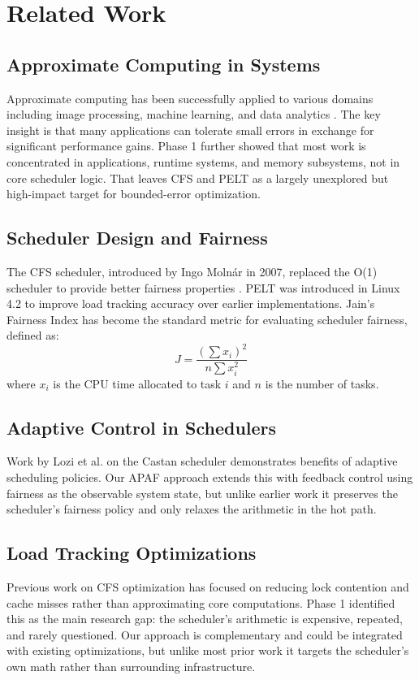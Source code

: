 \documentclass[conference]{IEEEtran}
\begin{document}
\section{Related Work}\label{sec:relwork}

\subsection{Approximate Computing in Systems}
Approximate computing has been successfully applied to various domains including image processing, machine learning, and data analytics \cite{b1}. The key insight is that many applications can tolerate small errors in exchange for significant performance gains. Phase 1 further showed that most work is concentrated in applications, runtime systems, and memory subsystems, not in core scheduler logic. That leaves CFS and PELT as a largely unexplored but high-impact target for bounded-error optimization.

\subsection{Scheduler Design and Fairness}
The CFS scheduler, introduced by Ingo Molnár in 2007, replaced the O(1) scheduler to provide better fairness properties \cite{b8}. PELT was introduced in Linux 4.2 to improve load tracking accuracy over earlier implementations. Jain's Fairness Index \cite{b9} has become the standard metric for evaluating scheduler fairness, defined as:
\begin{equation}
J = \frac{(\sum x_i)^2}{n \sum x_i^2}
\label{eq:jain}
\end{equation}
where $x_i$ is the CPU time allocated to task $i$ and $n$ is the number of tasks.

\subsection{Adaptive Control in Schedulers}
Work by Lozi et al. \cite{b10} on the Castan scheduler demonstrates benefits of adaptive scheduling policies. Our APAF approach extends this with feedback control using fairness as the observable system state, but unlike earlier work it preserves the scheduler's fairness policy and only relaxes the arithmetic in the hot path.

\subsection{Load Tracking Optimizations}
Previous work on CFS optimization has focused on reducing lock contention and cache misses rather than approximating core computations. Phase 1 identified this as the main research gap: the scheduler's arithmetic is expensive, repeated, and rarely questioned. Our approach is complementary and could be integrated with existing optimizations, but unlike most prior work it targets the scheduler's own math rather than surrounding infrastructure.
\end{document}

